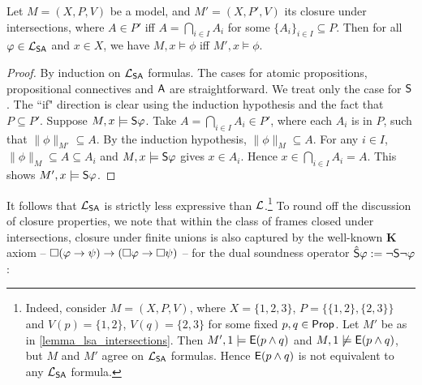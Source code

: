 \begin{lemma}
\label{lemma_lsa_intersections}

    Let $M = (X, P, V)$ be a model, and $M' = (X, P', V)$ its closure under
    intersections, where $A \in P'$ iff $A = \bigcap_{i \in I}{A_i}$ for some
    $\{A_i\}_{i \in I} \subseteq P$. Then for all $\phi \in \cLSA$ and $x \in
    X$, we have $M, x \models \phi$ iff $M', x \models \phi$.

\end{lemma}

\begin{proof}

    By induction on $\cLSA$ formulas. The cases for atomic
    propositions, propositional connectives and $\A$ are straightforward. We
    treat only the case for $\S$.
    The ``if" direction is clear using
    the induction hypothesis and the fact that $P \subseteq P'$. Suppose $M, x
    \models \S\phi$. Take $A = \bigcap_{i \in I}{A_i} \in P'$, where each $A_i$
    is in $P$, such that $\|\phi\|_{M'} \subseteq A$. By the induction
    hypothesis, $\|\phi\|_M \subseteq A$. For any $i \in I$, $\|\phi\|_M
    \subseteq A \subseteq A_i$ and $M, x \models \S\phi$ gives $x \in A_i$.
    Hence $x \in \bigcap_{i \in I}{A_i} = A$. This shows $M', x \models
    \S\phi$.

\end{proof}

It follows that $\cLSA$ is strictly less expressive than $\cL$.\footnote{
    Indeed, consider $M = (X, P, V)$, where $X = \{1, 2, 3\}$, $P = \{\{1, 2\}, \{2,
    3\}\}$ and $V(p) = \{1, 2\}$, $V(q) = \{2, 3\}$ for some fixed $p, q \in
    \Prop$. Let $M'$ be as in \cref{lemma_lsa_intersections}. Then $M', 1
    \models \E(p \land q)$ and $M, 1 \not\models \E(p \land q)$, but $M$ and
    $M'$ agree on $\cLSA$ formulas. Hence $\E(p \land q)$ is not equivalent to
    any $\cLSA$ formula.
}
%
To round off the discussion of closure properties, we note that within the
class of frames closed under intersections, closure under finite unions is also
captured by the well-known \textbf{K} axiom -- $\Box(\phi \limplies \psi)
\limplies (\Box\phi \limplies \Box\psi)$ -- for the dual soundness operator
$\hat{\S}\phi := \neg\S\neg\phi$:

